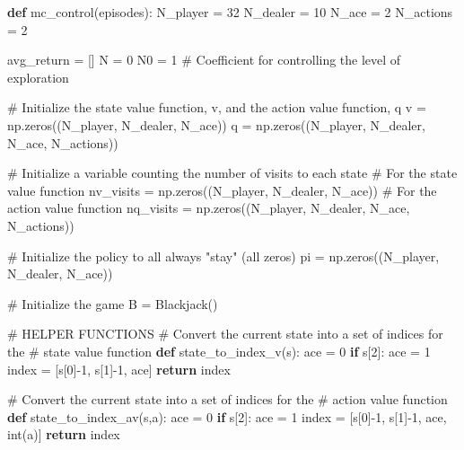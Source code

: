 \documentclass[
  letterpaper,
  DIV=11,
  numbers=noendperiod]{scrartcl}
\newenvironment{Shaded}{\begin{snugshade}}{\end{snugshade}}
\newcommand{\BuiltInTok}[1]{\textcolor[rgb]{0.00,0.23,0.31}{#1}}
\newcommand{\CommentTok}[1]{\textcolor[rgb]{0.37,0.37,0.37}{#1}}
\newcommand{\ControlFlowTok}[1]{\textcolor[rgb]{0.00,0.23,0.31}{\textbf{#1}}}
\newcommand{\DecValTok}[1]{\textcolor[rgb]{0.68,0.00,0.00}{#1}}
\newcommand{\KeywordTok}[1]{\textcolor[rgb]{0.00,0.23,0.31}{\textbf{#1}}}
\newcommand{\NormalTok}[1]{\textcolor[rgb]{0.00,0.23,0.31}{#1}}
\newcommand{\OperatorTok}[1]{\textcolor[rgb]{0.37,0.37,0.37}{#1}}
\begin{document}
\begin{Shaded}
\begin{Highlighting}[]
\KeywordTok{def}\NormalTok{ mc\_control(episodes):}
\NormalTok{    N\_player  }\OperatorTok{=} \DecValTok{32}
\NormalTok{    N\_dealer  }\OperatorTok{=} \DecValTok{10}
\NormalTok{    N\_ace     }\OperatorTok{=} \DecValTok{2}
\NormalTok{    N\_actions }\OperatorTok{=} \DecValTok{2}
    
\NormalTok{    avg\_return }\OperatorTok{=}\NormalTok{ []}
\NormalTok{    N          }\OperatorTok{=} \DecValTok{0}
\NormalTok{    N0         }\OperatorTok{=} \DecValTok{1} \CommentTok{\# Coefficient for controlling the level of exploration}
    
    \CommentTok{\# Initialize the state value function, v, and the action value function, q}
\NormalTok{    v }\OperatorTok{=}\NormalTok{ np.zeros((N\_player, N\_dealer, N\_ace))}
\NormalTok{    q }\OperatorTok{=}\NormalTok{ np.zeros((N\_player, N\_dealer, N\_ace, N\_actions))}
    
    \CommentTok{\# Initialize a variable counting the number of visits to each state}
    \CommentTok{\# For the state value function}
\NormalTok{    nv\_visits }\OperatorTok{=}\NormalTok{ np.zeros((N\_player, N\_dealer, N\_ace)) }
    \CommentTok{\# For the action value function}
\NormalTok{    nq\_visits }\OperatorTok{=}\NormalTok{ np.zeros((N\_player, N\_dealer, N\_ace, N\_actions)) }
    
    \CommentTok{\# Initialize the policy to all always "stay" (all zeros)}
\NormalTok{    pi }\OperatorTok{=}\NormalTok{ np.zeros((N\_player, N\_dealer, N\_ace))}
    
    \CommentTok{\# Initialize the game}
\NormalTok{    B  }\OperatorTok{=}\NormalTok{ Blackjack()}

    \CommentTok{\# HELPER FUNCTIONS}
    \CommentTok{\# Convert the current state into a set of indices for the }
    \CommentTok{\#  state value function}
    \KeywordTok{def}\NormalTok{ state\_to\_index\_v(s):}
\NormalTok{        ace }\OperatorTok{=} \DecValTok{0}
        \ControlFlowTok{if}\NormalTok{ s[}\DecValTok{2}\NormalTok{]:}
\NormalTok{            ace }\OperatorTok{=} \DecValTok{1}
\NormalTok{        index }\OperatorTok{=}\NormalTok{ [s[}\DecValTok{0}\NormalTok{]}\OperatorTok{{-}}\DecValTok{1}\NormalTok{, s[}\DecValTok{1}\NormalTok{]}\OperatorTok{{-}}\DecValTok{1}\NormalTok{, ace]}
        \ControlFlowTok{return}\NormalTok{ index}
    
    \CommentTok{\# Convert the current state into a set of indices for the }
    \CommentTok{\#  action value function}
    \KeywordTok{def}\NormalTok{ state\_to\_index\_av(s,a):}
\NormalTok{        ace }\OperatorTok{=} \DecValTok{0}
        \ControlFlowTok{if}\NormalTok{ s[}\DecValTok{2}\NormalTok{]:}
\NormalTok{            ace }\OperatorTok{=} \DecValTok{1}
\NormalTok{        index }\OperatorTok{=}\NormalTok{ [s[}\DecValTok{0}\NormalTok{]}\OperatorTok{{-}}\DecValTok{1}\NormalTok{, s[}\DecValTok{1}\NormalTok{]}\OperatorTok{{-}}\DecValTok{1}\NormalTok{, ace, }\BuiltInTok{int}\NormalTok{(a)]}
        \ControlFlowTok{return}\NormalTok{ index}
    

\end{Highlighting}
\end{Shaded}
\end{document}

